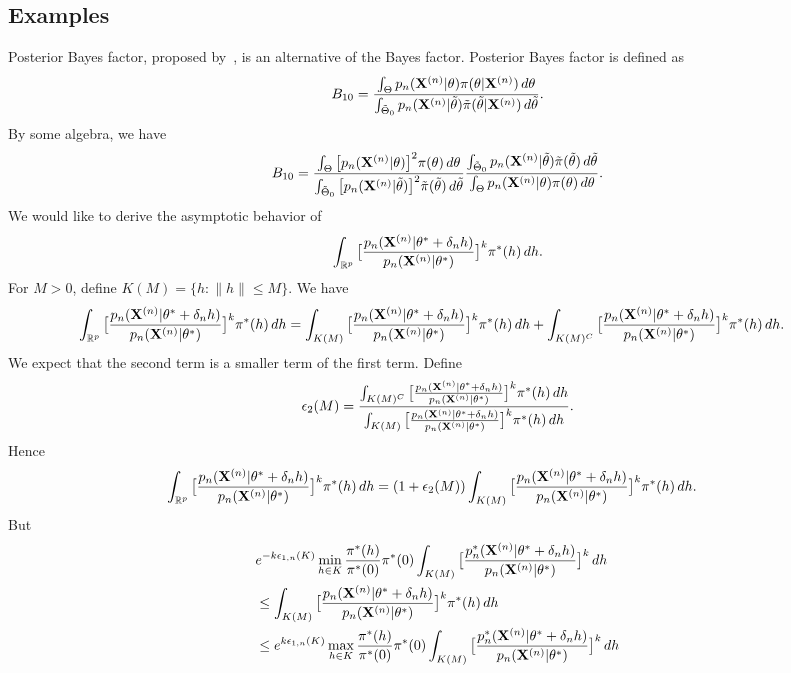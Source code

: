 \documentclass[3p]{elsarticle}
\theoremstyle{plain}
\theoremstyle{definition}
\theoremstyle{remark}
\begin{document}
\subsection{Examples}
Posterior Bayes factor, proposed by~\cite{Aitkin1991Posterior}, is an alternative of the Bayes factor. Posterior Bayes factor is defined as
$$
B_{10}=\frac{\int_{\Theta}p_n(\mathbf{X}^{(n)}|\theta)\pi(\theta|\mathbf{X}^{(n)})\, d\theta}{\int_{\tilde{\Theta}_0} p_n(\mathbf{X}^{(n)}|\tilde{\theta})\tilde{\pi}(\tilde{\theta}|\mathbf{X}^{(n)})\,d\tilde{\theta}}
.
$$
By some algebra, we have
$$
B_{10}
=
\frac{\int_{\Theta}\big[p_n(\mathbf{X}^{(n)}|\theta)\big]^2\pi(\theta)\, d\theta}{\int_{\tilde{\Theta}_0} \big[p_n(\mathbf{X}^{(n)}|\tilde{\theta})\big]^2\tilde{\pi}(\tilde{\theta})\,d\tilde{\theta}}
\frac{\int_{\tilde{\Theta}_0} p_n(\mathbf{X}^{(n)}|\tilde{\theta})\tilde{\pi}(\tilde{\theta})\,d\tilde{\theta}}{\int_{\Theta}p_n(\mathbf{X}^{(n)}|\theta)\pi(\theta)\, d\theta}
.
$$
We would like to derive the asymptotic behavior of
$$
\int_{\mathbb{R}^p}\big[\frac{p_n(\mathbf{X}^{(n)}|\theta^*+\delta_n h)}{p_n(\mathbf{X}^{(n)}|\theta^*)}\big]^k \pi^*(h) \, dh.
$$
For $M>0$, define $K(M)=\{h: \|h\|\leq M\}$. We have
$$
\begin{aligned}
    &\int_{\mathbb{R}^p}\big[\frac{p_n(\mathbf{X}^{(n)}|\theta^*+\delta_n h)}{p_n(\mathbf{X}^{(n)}|\theta^*)}\big]^k \pi^*(h) \, dh
=
    \int_{K(M)}\big[\frac{p_n(\mathbf{X}^{(n)}|\theta^*+\delta_n h)}{p_n(\mathbf{X}^{(n)}|\theta^*)}\big]^k \pi^*(h) \, dh
    +
    \int_{K(M)^C}\big[\frac{p_n(\mathbf{X}^{(n)}|\theta^*+\delta_n h)}{p_n(\mathbf{X}^{(n)}|\theta^*)}\big]^k \pi^*(h) \, dh
    .
\end{aligned}
$$
We expect that the second term is a smaller term of the first term.
Define
$$
\epsilon_{2}(M)=
\frac{
    \int_{K(M)^C}\big[\frac{p_n(\mathbf{X}^{(n)}|\theta^*+\delta_n h)}{p_n(\mathbf{X}^{(n)}|\theta^*)}\big]^k \pi^*(h) \, dh
}{
    \int_{K(M)}\big[\frac{p_n(\mathbf{X}^{(n)}|\theta^*+\delta_n h)}{p_n(\mathbf{X}^{(n)}|\theta^*)}\big]^k \pi^*(h) \, dh
}.
$$
Hence
$$
\begin{aligned}
    &\int_{\mathbb{R}^p}\big[\frac{p_n(\mathbf{X}^{(n)}|\theta^*+\delta_n h)}{p_n(\mathbf{X}^{(n)}|\theta^*)}\big]^k \pi^*(h) \, dh
=
    (1+\epsilon_2(M))\int_{K(M)}\big[\frac{p_n(\mathbf{X}^{(n)}|\theta^*+\delta_n h)}{p_n(\mathbf{X}^{(n)}|\theta^*)}\big]^k \pi^*(h) \, dh
    .
\end{aligned}
$$
But
$$
\begin{aligned}
    &
e^{-k\epsilon_{1,n}(K)}
    \min_{h\in K} \frac{\pi^*(h)}{\pi^*(0)}
    \pi^*(0)
    \int_{K(M)}\big[\frac{p_n^*(\mathbf{X}^{(n)}|\theta^*+\delta_n h)}{p_n(\mathbf{X}^{(n)}|\theta^*)}\big]^k  \, dh
    \\
    &
\leq
\int_{K(M)}\big[\frac{p_n(\mathbf{X}^{(n)}|\theta^*+\delta_n h)}{p_n(\mathbf{X}^{(n)}|\theta^*)}\big]^k \pi^*(h) \, dh
    \\
    &
\leq
e^{k\epsilon_{1,n}(K)}
    \max_{h\in K} \frac{\pi^*(h)}{\pi^*(0)}
    \pi^*(0)
    \int_{K(M)}\big[\frac{p_n^*(\mathbf{X}^{(n)}|\theta^*+\delta_n h)}{p_n(\mathbf{X}^{(n)}|\theta^*)}\big]^k \, dh
\end{aligned}
$$
\end{document}
